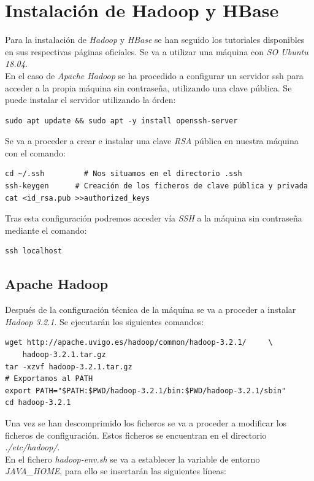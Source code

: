 \documentclass[11pt,a4paper]{article}
\begin{document}
\section{Instalación de Hadoop y HBase}

Para la instalación de \emph{Hadoop} y \emph{HBase} se han seguido los tutoriales disponibles en sus respectivas páginas oficiales. Se va a utilizar una máquina con \emph{SO Ubuntu 18.04}. \\
En el caso de \emph{Apache Hadoop} se ha procedido a configurar un servidor ssh para acceder a la propia máquina sin contraseña, utilizando una clave pública. Se puede instalar el servidor utilizando la órden:

\begin{lstlisting}
sudo apt update && sudo apt -y install openssh-server
\end{lstlisting}

Se va a proceder a crear e instalar una clave \emph{RSA} pública en nuestra máquina con el comando:

\begin{lstlisting}
cd ~/.ssh		  # Nos situamos en el directorio .ssh
ssh-keygen		# Creación de los ficheros de clave pública y privada
cat <id_rsa.pub >>authorized_keys
\end{lstlisting}

Tras esta configuración podremos acceder vía \emph{SSH} a la máquina sin contraseña mediante el comando:

\begin{lstlisting}
ssh localhost
\end{lstlisting}

\subsection{Apache Hadoop}

Después de la configuración técnica de la máquina se va a proceder a instalar \emph{Hadoop 3.2.1}. Se ejecutarán los siguientes comandos:

\begin{lstlisting}
wget http://apache.uvigo.es/hadoop/common/hadoop-3.2.1/		\
	hadoop-3.2.1.tar.gz
tar -xzvf hadoop-3.2.1.tar.gz
# Exportamos al PATH
export PATH="$PATH:$PWD/hadoop-3.2.1/bin:$PWD/hadoop-3.2.1/sbin" 
cd hadoop-3.2.1
\end{lstlisting}

Una vez se han descomprimido los ficheros se va a proceder a modificar los ficheros de configuración. Estos ficheros se encuentran en el directorio \emph{./etc/hadoop/}.\\
En el fichero \emph{hadoop-env.sh} se va a establecer la variable de entorno \emph{JAVA\_{}HOME}, para ello se insertarán las siguientes líneas:
\end{document}
